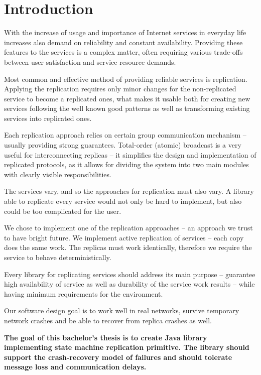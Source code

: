 
\chapter{Introduction}

With the increase of usage and importance of Internet services in everyday life increases also demand on reliability and constant availability.
Providing these features to the services is a complex matter, often requiring various trade-offs between user satisfaction and service resource demands.

Most common and effective method of providing reliable services is replication. Applying the replication requires only minor changes for the non-replicated service to become a replicated ones, what makes it usable both for creating new services following the well known good patterns as well as transforming existing services into replicated ones.

Each replication approach relies on certain group communication mechanism -- usually providing strong guarantees. Total-order (atomic) broadcast is a very useful for interconnecting replicas -- it simplifies the design and implementation of replicated protocols, as it allows for dividing the system into two main modules with clearly visible responsibilities.

The services vary, and so the approaches for replication must also vary. A library able to replicate every service would not only be hard to implement, but also could be too complicated for the user.

We chose to implement one of the replication approaches -- an approach we trust to have bright future.
We implement active replication of services -- each copy does the same work. The replicas must work identically, therefore we require the service to behave deterministically.

Every library for replicating services should address its main purpose -- guarantee high availability of service as well as durability of the service work results -- while having minimum requirements for the environment.

Our software design goal is to work well in real networks, survive temporary network crashes and be able to recover from replica crashes as well.

{
\bfseries
The goal of this bachelor's thesis is to create Java library implementing state machine replication primitive. The library should support the crash-recovery model of failures and should tolerate message loss and communication delays.
}

